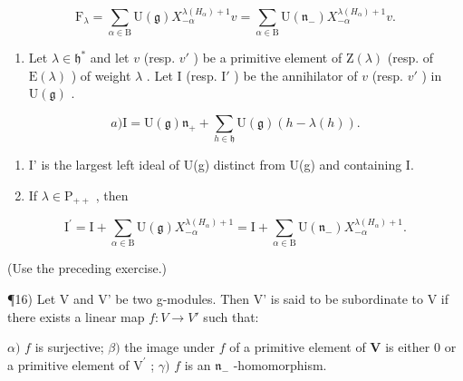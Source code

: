 \[
\mathrm{F} _ {\lambda} = \sum_ {\alpha \in \mathrm{B}} \mathrm{U} (\mathfrak {g}) X _ {- \alpha} ^ {\lambda (H _ {\alpha}) + 1} v = \sum_ {\alpha \in \mathrm{B}} \mathrm{U} (\mathfrak {n} _ {-}) X _ {- \alpha} ^ {\lambda (H _ {\alpha}) + 1} v.
\]

\begin{enumerate}
\def\labelenumi{\arabic{enumi})}
\setcounter{enumi}{14}
\tightlist
\item
  Let \(\lambda \in \mathfrak{h}^*\) and let \(v\) (resp. \(v'\) ) be a primitive element of \(\mathrm{Z}(\lambda)\) (resp. of \(\mathrm{E}(\lambda)\) ) of weight \(\lambda\) . Let \(\mathrm{I}\) (resp. \(\mathrm{I}'\) ) be the annihilator of \(v\) (resp. \(v'\) ) in \(\mathrm{U}(\mathfrak{g})\) .
\end{enumerate}

\[
a) \mathrm{I} = \mathrm{U} (\mathfrak {g}) \mathfrak {n} _ {+} + \sum_ {h \in \mathfrak {h}} \mathrm{U} (\mathfrak {g}) (h - \lambda (h)).
\]

\begin{enumerate}
\def\labelenumi{\alph{enumi})}
\setcounter{enumi}{1}
\item
  I' is the largest left ideal of U(g) distinct from U(g) and containing I.
\item
  If \(\lambda \in \mathrm{P}_{++}\) , then
\end{enumerate}

\[
\mathrm{I} ^ {\prime} = \mathrm{I} + \sum_ {\alpha \in \mathrm{B}} \mathrm{U} (\mathfrak {g}) X _ {- \alpha} ^ {\lambda (H _ {\alpha}) + 1} = \mathrm{I} + \sum_ {\alpha \in \mathrm{B}} \mathrm{U} (\mathfrak {n} _ {-}) X _ {- \alpha} ^ {\lambda (H _ {\alpha}) + 1}.
\]

(Use the preceding exercise.)

¶16) Let V and V' be two g-modules. Then V' is said to be subordinate to V if there exists a linear map \(f : V \to V'\) such that:

\(\alpha)\) \(f\) is surjective; \(\beta)\) the image under \(f\) of a primitive element of \(\mathbf{V}\) is either 0 or a primitive element of \(\mathrm{V}^{\prime}\) ; \(\gamma)\) \(f\) is an \(\mathfrak{n}_{-}\) -homomorphism.

